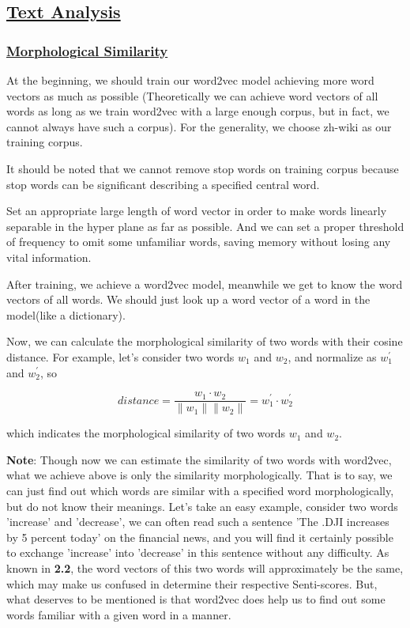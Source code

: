\documentclass[10pt, conference, compsocconf]{IEEEtran}
\begin{document}
\subsection{\underline{Text Analysis}}
\subsubsection{\underline{Morphological Similarity}}

At the beginning, we should train our word2vec model achieving more word vectors as much as possible (Theoretically we can achieve word vectors of all words as long as we train word2vec with a large enough corpus, but in fact, we cannot always have such a corpus). For the generality, we choose zh-wiki as our training corpus.

It should be noted that we cannot remove stop words on training corpus because stop words can be significant describing a specified central word.

Set an appropriate large length of word vector in order to make words linearly separable in the hyper plane as far as possible. And we can set a proper threshold of frequency to omit some unfamiliar words, saving memory without losing any vital information.

After training, we achieve a word2vec model, meanwhile we get to know the word vectors of all words. We should just look up a word vector of a word in the model(like a dictionary).

Now, we can calculate the morphological similarity of two words with their cosine distance. For example, let's consider two words $w_{1}$ and $w_{2}$, and normalize as $w_{1}^{'}$ and $w_{2}^{'}$, so

\begin{equation}
distance = \frac{w_{1}\cdot w_{2}}{\|w_{1}\|\|w_{2}\|} = w_{1}^{'}\cdot w_{2}^{'}
\end{equation}

which indicates the morphological similarity of two words $w_{1}$ and $w_{2}$.

\textbf{Note}: Though now we can estimate the similarity of two words with word2vec, what we achieve above is only the similarity morphologically. That is to say, we can just find out which words are similar with a specified word morphologically, but do not know their meanings. Let's take an easy example, consider two words 'increase' and 'decrease', we can often read such a sentence 'The .DJI increases by 5 percent today' on the financial news, and you will find it certainly possible to exchange 'increase' into 'decrease' in this sentence without any difficulty. As known in \textbf{2.2}, the word vectors of this two words will approximately be the same, which may make us confused in determine their respective Senti-scores. But, what deserves to be mentioned is that word2vec does help us to find out some words familiar with a given word in a manner.
\end{document}
